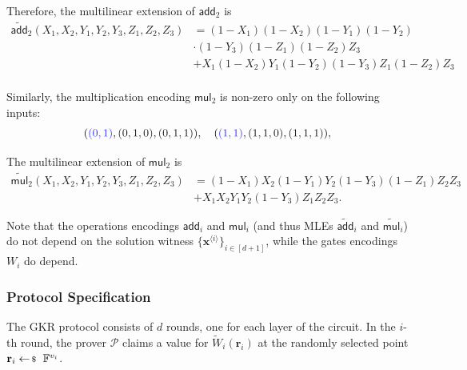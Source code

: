 Therefore, the multilinear extension of $\mathsf{add}_2$ is
\begin{align*}
    \widetilde{\mathsf{add}}_2(X_1,X_2,Y_1,Y_2,Y_3,Z_1,Z_2,Z_3) &= (1-X_1)(1-X_2)(1-Y_1)(1-Y_2)\\
    &\cdot (1-Y_3)(1-Z_1)(1-Z_2)Z_3 \\
    &+ X_1(1-X_2)Y_1(1-Y_2)(1-Y_3)Z_1(1-Z_2)Z_3 \\
\end{align*}

Similarly, the multiplication encoding $\mathsf{mul}_2$ is non-zero only on the
following inputs:
\begin{equation*}
    (\textcolor{blue!80}{(0,1)},\textcolor{gray!20!black}{(0,1,0)},\textcolor{gray!20!black}{(0,1,1)}), 
    \quad
    (\textcolor{blue!80}{(1,1)},\textcolor{gray!20!black}{(1,1,0)},\textcolor{gray!20!black}{(1,1,1)}),
\end{equation*}

The multilinear extension of $\mathsf{mul}_2$ is
\begin{align*}
    \widetilde{\mathsf{mul}}_2(X_1,X_2,Y_1,Y_2,Y_3,Z_1,Z_2,Z_3) &= (1-X_1)X_2(1-Y_1)Y_2(1-Y_3)(1-Z_1)Z_2Z_3 \\
    &+ X_1X_2Y_1Y_2(1-Y_3)Z_1Z_2Z_3.
\end{align*}

\begin{remark}
    Note that the operations encodings $\mathsf{add}_i$ and $\mathsf{mul}_i$
    (and thus MLEs $\widetilde{\mathsf{add}}_i$ and
    $\widetilde{\mathsf{mul}}_i$) do not depend on the solution witness
    $\{\mathbf{x}^{\langle i \rangle}\}_{i \in [d+1]}$, while the gates
    encodings $W_i$ do depend.
\end{remark}

\subsubsection{Protocol Specification}

The GKR protocol consists of $d$ rounds, one for each layer of the circuit. In
the $i$-th round, the prover $\mathcal{P}$ claims a value for
$\widetilde{W}_i(\mathbf{r}_i)$ at the randomly selected point $\mathbf{r}_i
\leftarrowS \mathbb{F}^{v_i}$. 

